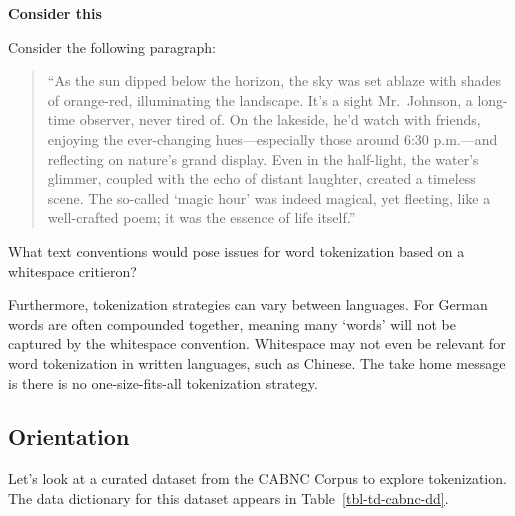 \documentclass[
  letterpaper,
  DIV=11,
  numbers=noendperiod]{scrreport}
\theoremstyle{definition}
\theoremstyle{remark}
\begin{document}
\begin{tcolorbox}[enhanced jigsaw, breakable, colback=white, rightrule=.15mm, arc=.35mm, left=2mm, toprule=.15mm, leftrule=.75mm, bottomrule=.15mm, opacityback=0]

\textbf{ Consider this}

Consider the following paragraph:

\begin{quote}
``As the sun dipped below the horizon, the sky was set ablaze with
shades of orange-red, illuminating the landscape. It's a sight
Mr.~Johnson, a long-time observer, never tired of. On the lakeside, he'd
watch with friends, enjoying the ever-changing hues---especially those
around 6:30 p.m.---and reflecting on nature's grand display. Even in the
half-light, the water's glimmer, coupled with the echo of distant
laughter, created a timeless scene. The so-called `magic hour' was
indeed magical, yet fleeting, like a well-crafted poem; it was the
essence of life itself.''
\end{quote}

What text conventions would pose issues for word tokenization based on a
whitespace critieron?

\end{tcolorbox}

Furthermore, tokenization strategies can vary between languages. For
German words are often compounded together, meaning many `words' will
not be captured by the whitespace convention. Whitespace may not even be
relevant for word tokenization in written languages, such as Chinese.
The take home message is there is no one-size-fits-all tokenization
strategy.

\hypertarget{sec-td-tokenization-orientation}{%
\subsection{Orientation}\label{sec-td-tokenization-orientation}}

Let's look at a curated dataset from the CABNC Corpus to explore
tokenization. The data dictionary for this dataset appears in
Table~\ref{tbl-td-cabnc-dd}.
\end{document}
